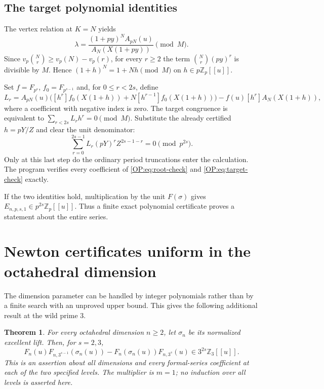 \documentclass[11pt,a4paper]{article}
\newtheorem{theorem}{Theorem}[section]
\theoremstyle{definition}\newtheorem{definition}[theorem]{Definition}
\theoremstyle{remark}\newtheorem{remark}[theorem]{Remark}
\newcommand{\Z}{\mathbb Z}
\newcommand{\vp}{v_p}
\numberwithin{equation}{section}
\begin{document}
\subsection{The target polynomial identities}
The vertex relation at $K=N$ yields
\[
 \lambda=\frac{(1+py)^N A_{pN}(u)}{A_N(X(1+py))}\pmod M.
\]
Since $\vp\binom Nr\ge\vp(N)-\vp(r)$, for every $r\ge2$ the term
$\binom Nr(py)^r$ is divisible by $M$. Hence
$(1+h)^N=1+Nh\pmod M$ on $h\in p\Z_p[[u]]$.

Set $f=F_{p^s}$, $f_0=F_{p^{s-1}}$ and, for $0\le r<2s$, define
\[
 L_r=A_{pN}(u)\bigl([h^r]f_0(X(1+h))
               +N[h^{r-1}]f_0(X(1+h))\bigr)
          -f(u)[h^r]A_N(X(1+h)),
\]
where a coefficient with negative index is zero.
The target congruence is equivalent to
$\sum_{r<2s}L_rh^r=0\pmod M$.
Substitute the already certified $h=pY/Z$ and clear the unit denominator:
\begin{equation}\label{OP:eq:target-check}
 \boxed{\ \sum_{r=0}^{2s-1}L_r(pY)^r Z^{2s-1-r}=0\pmod{p^{2s}}.\ }
\end{equation}
Only at this last step do the ordinary period truncations enter the
calculation. The program verifies every coefficient of
\eqref{OP:eq:root-check} and \eqref{OP:eq:target-check} exactly.


If the two identities hold, multiplication by the unit $F(\sigma)$
gives $E_{n,p,s,1}\in p^{2s}\mathbb Z_p[[u]]$. Thus a finite exact
polynomial certificate proves a statement about the entire series.
\par
\section{Newton certificates uniform in the octahedral dimension}\label{OP:source-main-8}
\label{OP:sec:dimension-newton}

The dimension parameter can be handled by integer polynomials rather
than by a finite search with an unproved upper bound.  This gives the
following additional result at the wild prime $3$.

\begin{theorem}\label{OP:thm:uniform-dimension-levels23}
For every octahedral dimension $n\geq2$, let $\sigma_n$ be its normalized
excellent lift.  Then, for $s=2,3$,
\[
 F_n(u)F_{n,3^{s-1}}(\sigma_n(u))-
 F_n(\sigma_n(u))F_{n,3^s}(u)
                 \in3^{2s}\mathbb Z_3[[u]].
\]
This is an assertion about all dimensions and every formal-series
coefficient at each of the two specified levels.  The multiplier is
$m=1$; no induction over all levels is asserted here.
\end{theorem}
\end{document}
